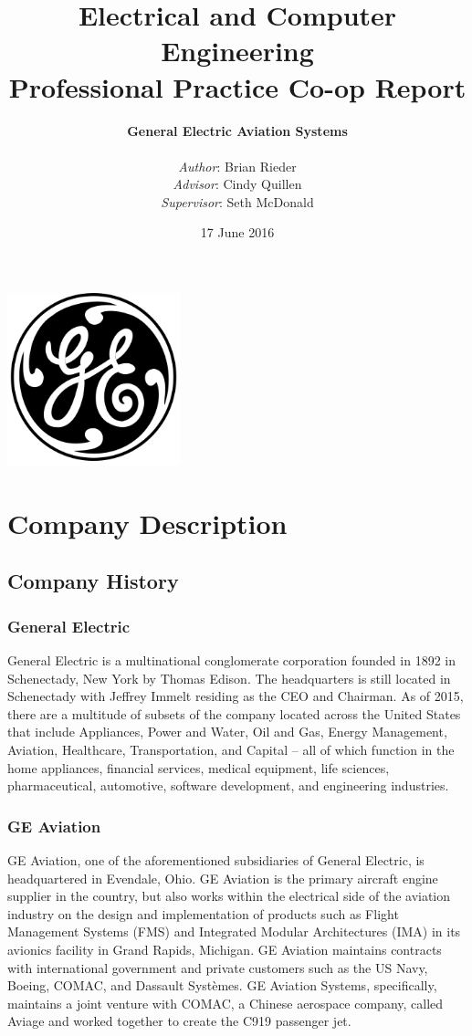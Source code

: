 \documentclass{article}
\title{Electrical and Computer Engineering \\ 
Professional Practice Co-op Report
}
\author{
\textbf{General Electric Aviation Systems} \\
\\
\textit{Author}:     Brian Rieder\\
\textit{Advisor}:    Cindy Quillen\\
\textit{Supervisor}: Seth McDonald
}
\date{17 June 2016}
\begin{document}
\maketitle
\begin{center}
  \includegraphics[width=5cm,height=5cm,keepaspectratio]{General_Electric_1930.png}
\end{center}
\newpage

\tableofcontents
{}
\newpage


\section{Company Description}
\subsection{Company History}
\subsubsection{General Electric}
General Electric is a multinational conglomerate corporation founded in 1892 in Schenectady, New York by Thomas Edison. The headquarters is still located in Schenectady with Jeffrey Immelt residing as the CEO and Chairman. 
As of 2015, there are a multitude of subsets of the company located across the United States that include Appliances, Power and Water, Oil and Gas, Energy Management, Aviation, Healthcare, Transportation, and Capital -- all of which function in the home appliances, financial services, medical equipment, life sciences, pharmaceutical, automotive, software development, and engineering industries.
\subsubsection{GE Aviation}
GE Aviation, one of the aforementioned subsidiaries of General Electric, is headquartered in Evendale, Ohio. GE Aviation is the primary aircraft engine supplier in the country, but also works within the electrical side of the aviation industry on the design and implementation of products such as Flight Management Systems (FMS) and Integrated Modular Architectures (IMA) in its avionics facility in Grand Rapids, Michigan. 
GE Aviation maintains contracts with international government and private customers such as the US Navy, Boeing, COMAC, and Dassault Systèmes. 
GE Aviation Systems, specifically, maintains a joint venture with COMAC, a Chinese aerospace company, called Aviage and worked together to create the C919 passenger jet.
\end{document}
